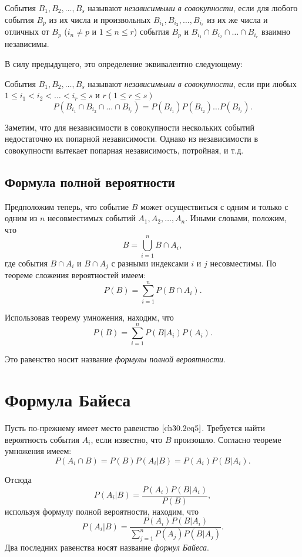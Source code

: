 События $B_1,B_2, \ldots, B_s$ называют \textit{независимыми в совокупности}, если для любого события $B_p$ из их числа и произвольных $B_{i_1}, B_{i_2}, \ldots, B_{i_r}$ из их же числа и отличных от $B_p$  ($i_n \not= p$  и $1 \le n \le r$) события $B_p$ и $B_{i_1}\cap B_{i_2}\cap \ldots\cap B_{i_r}$ взаимно независимы.

В силу предыдущего, это определение эквивалентно следующему:
\begin{defn} События $B_1,B_2, \ldots, B_s$ называют \textit{независимыми в совокупности}, если при любых $1 \le i_1 < i_2 < \ldots < i_r \le s$ и $r (1 \le r \le s)$
$$
P(B_{i_1}\cap B_{i_2}\cap\ldots\cap B_{i_r}) = P(B_{i_1})P(B_{i_2}) \ldots P(B_{i_r}).
$$
\end{defn}
Заметим, что для независимости в совокупности нескольких событий недостаточно их попарной независимости. Однако из независимости в совокупности вытекает попарная независимость, потройная, и т.д.

\subsection{Формула полной вероятности}
Предположим теперь, что событие $B$ может осуществиться с одним и только с одним из $n$ несовместимых событий $A_1,A_2, \ldots, A_n$. Иными словами, положим, что
\begin{equation} \label{ch30.2eq5}
B = \bigcup\limits_{i = 1}^{n} B \cap A_i,
\end{equation}
где события $B\cap A_i$ и $B\cap A_j$ с разными индексами $i$ и $j$ несовместимы. По теореме сложения вероятностей имеем:
$$
P(B) = \sum_{i = 1}^{n} P(B\cap A_i).
$$

Использовав теорему умножения, находим, что
$$
P(B) = \sum_{i = 1}^{n} P(B|A_i)P(A_i).
$$

Это равенство носит название \textit{формулы полной вероятности}.

\section{Формула Байеса}
Пусть по-прежнему имеет место равенство $\eqref{ch30.2eq5}$. Требуется найти вероятность события $A_i$, если известно, что $B$ произошло. Согласно теореме умножения имеем:
$$
P(A_i\cap B) = P(B)P(A_i|B) = P(A_i)P(B|A_i).
$$

Отсюда
$$
P(A_i|B) = \frac{P(A_i)P(B|A_i)}{P(B)},
$$
используя формулу полной вероятности, находим, что
$$
P(A_i|B) = \frac{P(A_i)P(B|A_i)}{\sum\limits_{j = 1}^{n} P(A_j)P(B|A_j)}.
$$
Два последних равенства носят название \textit{формул Байеса}.
